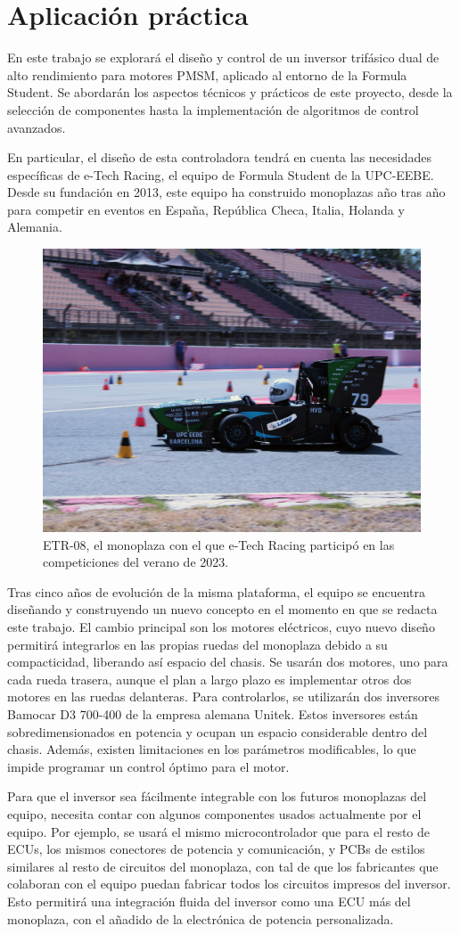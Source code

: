 \section{Aplicación práctica}
En este trabajo se explorará el diseño y control de un inversor trifásico dual de alto rendimiento para motores PMSM, aplicado al entorno de la Formula Student. Se abordarán los aspectos técnicos y prácticos de este proyecto, desde la selección de componentes hasta la implementación de algoritmos de control avanzados.

En particular, el diseño de esta controladora tendrá en cuenta las necesidades específicas de e-Tech Racing, el equipo de Formula Student de la UPC-EEBE. Desde su fundación en 2013, este equipo ha construido monoplazas año tras año para competir en eventos en España, República Checa, Italia, Holanda y Alemania.

\begin{figure}[H]
	\centering
	\includegraphics[width=0.7\linewidth]{fig/IMG_1834}
	\caption{ETR-08, el monoplaza con el que e-Tech Racing participó en las competiciones del verano de 2023.}
\end{figure}

Tras cinco años de evolución de la misma plataforma, el equipo se encuentra diseñando y construyendo un nuevo concepto en el momento en que se redacta este trabajo. El cambio principal son los motores eléctricos, cuyo nuevo diseño permitirá integrarlos en las propias ruedas del monoplaza debido a su compacticidad, liberando así espacio del chasis. Se usarán dos motores, uno para cada rueda trasera, aunque el plan a largo plazo es implementar otros dos motores en las ruedas delanteras. Para controlarlos, se utilizarán dos inversores Bamocar D3 700-400 de la empresa alemana Unitek. Estos inversores están sobredimensionados en potencia y ocupan un espacio considerable dentro del chasis. Además, existen limitaciones en los parámetros modificables, lo que impide programar un control óptimo para el motor.

Para que el inversor sea fácilmente integrable con los futuros monoplazas del equipo, necesita contar con algunos componentes usados actualmente por el equipo. Por ejemplo, se usará el mismo microcontrolador que para el resto de ECUs, los mismos conectores de potencia y comunicación, y PCBs de estilos similares al resto de circuitos del monoplaza, con tal de que los fabricantes que colaboran con el equipo puedan fabricar todos los circuitos impresos del inversor. Esto permitirá una integración fluida del inversor como una ECU más del monoplaza, con el añadido de la electrónica de potencia personalizada.